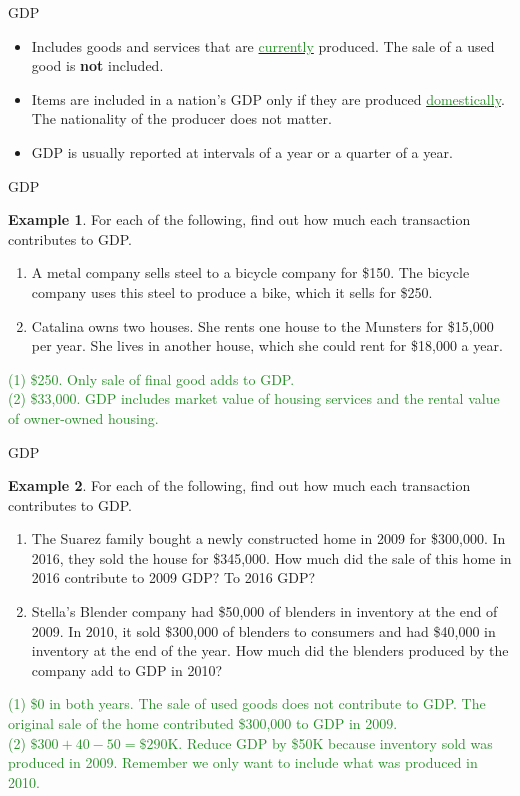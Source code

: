 \documentclass[xcolor={dvipsnames},pdf, hyperref={colorlinks=true, citecolor=ForestGreen, linkcolor=BlueViolet, urlcolor=Magenta}]{beamer}
\theoremstyle{definition}
\newtheorem{exmp}{Example}[section]
\newcommand{\ddp}[1]{{\textcolor{ForestGreen}{#1}}}
\newcommand{\dd}[1]{{\underline{\textcolor{ForestGreen}{#1}}}}
\begin{document}
\begin{frame}{GDP}
\begin{itemize}
	\item Includes goods and services that are \dd{currently} produced. The sale of a used good is \textbf{not} included. 
	\item Items are included in a nation's GDP only if they are produced \dd{domestically}. The nationality of the producer does not matter.
	\item GDP is usually reported at intervals of a year or a quarter of a year.
\end{itemize}
\end{frame}

\begin{frame}{GDP}
\begin{exmp} 

	For each of the following, find out how much each transaction contributes to GDP.
	\begin{enumerate}
		\item A metal company sells steel to a bicycle company for \$150. The bicycle company uses this steel to produce a bike, which it sells for \$250. 
		\item Catalina owns two houses. She rents one house to the Munsters for \$15,000 per year. She lives in another house, which she could rent for \$18,000 a year.
	\end{enumerate}
\end{exmp}

\ddp{\pause (1) \$250. Only sale of final good adds to GDP.\\
\pause (2) \$33,000. GDP includes market value of housing services and the rental value of owner-owned housing.}
\end{frame}

\begin{frame}{GDP}
\small
\begin{exmp}
		For each of the following, find out how much each transaction contributes to GDP.
	\begin{enumerate}
		\item The Suarez family bought a newly constructed home in 2009 for \$300,000. In 2016, they sold the house for \$345,000. How much did the sale of this home in 2016 contribute to 2009 GDP? To 2016 GDP?

		\item Stella's Blender company had \$50,000 of blenders in inventory at the end of 2009. In 2010, it sold \$300,000 of blenders to consumers and had \$40,000 in inventory at the end of the year. How much did the blenders produced by the company add to GDP in 2010?
	\end{enumerate}
\end{exmp}

\ddp{\pause (1) \$0 in both years. The sale of used goods does not contribute to GDP. The original sale of the home contributed \$300,000 to GDP in 2009. \\
\pause (2) $\$300 + 40 - 50 = \$290$K. Reduce GDP by \$50K because inventory sold was produced in 2009. Remember we only want to include what was produced in 2010.}
\end{frame}
\end{document}
